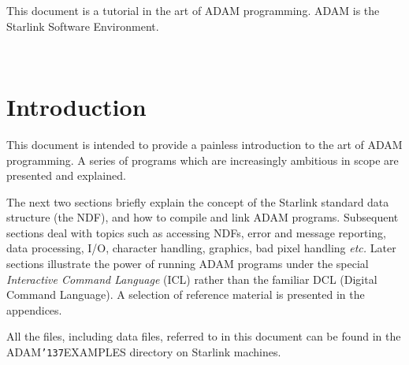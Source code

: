 \documentclass[twoside,11pt]{article}
\newcommand{\stardocinitials}  {SUN}
\newcommand{\stardocnumber}    {101.2}
\newcommand{\stardocabstract}  {This document is a tutorial in the art
of ADAM programming.  ADAM is the Starlink Software Environment.}
\newcommand{\stardocname}{\stardocinitials /\stardocnumber}
\renewcommand{\_}{{\tt\char'137}}
\newenvironment{latexonly}{}{}
\newcommand{\xlabel}[1]{}
\renewcommand{\thepage}{\roman{page}}
\begin{document}
\stardocabstract
\newpage
\begin{latexonly}
   \setlength{\parskip}{0mm}
   \tableofcontents
   \setlength{\parskip}{\medskipamount}
   \markright{\stardocname}
\end{latexonly}
\newpage
~
\newpage

\renewcommand{\thepage}{\arabic{page}}
\setcounter{page}{1}

\section{Introduction\label{intro}\xlabel{introduction}}

This document is intended to provide a painless introduction to  the art
of ADAM programming.
A series of programs which are increasingly ambitious  in scope are
presented and  explained.

The next  two sections briefly explain the
concept of the Starlink standard data structure (the NDF), and
how to compile and link ADAM programs.
Subsequent sections deal with
topics such as accessing  NDFs, error and message reporting, data processing,
I/O, character handling, graphics,
bad pixel handling {\it etc.}
Later sections illustrate the power of running ADAM programs under the
special {\sl Interactive Command Language} (ICL) rather than the familiar
DCL (Digital Command Language).
A selection of reference material is presented in the appendices.

All the files, including data files, referred to in this document can be
found in the ADAM\_EXAMPLES directory on Starlink machines.
\end{document}
